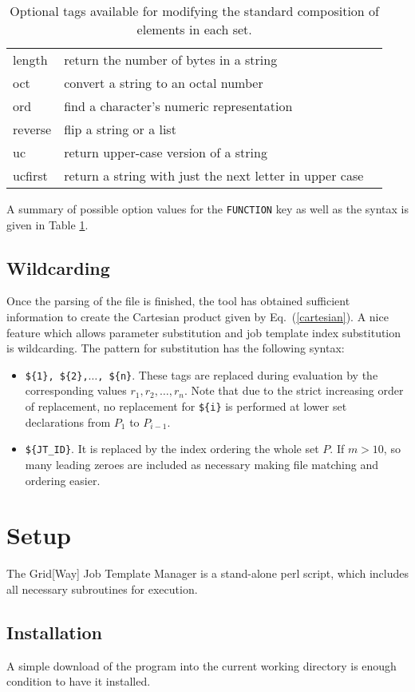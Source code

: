 \documentclass[12pt,a4paper]{article}
\newcommand{\eq}[1]{Eq.~(\ref{#1})}
\newcommand{\tab}[1]{Table \ref{#1}}
\begin{document}
\begin{table}[!ht]
{\begin{tabular}{lll}
 length&{\rm return the number of bytes in a string}\\
 oct&{\rm convert a string to an octal number}\\
 ord&{\rm find a character's numeric representation}\\
 reverse&{\rm flip a string or a list}\\
 uc&{\rm return upper-case version of a string}\\
 ucfirst&{\rm return a string with just the next letter in upper case}\\
\hline
\end{tabular}
}
\caption{Optional tags available for modifying the standard composition of elements in each set.}
\label{optionalsyntax}
\end{table}
A summary of possible option values for the {\tt FUNCTION} key as well as the syntax is given in \tab{optionalsyntax}.
\subsection{Wildcarding}
Once the parsing of the file is finished, the tool has obtained sufficient information to create the Cartesian product given by \eq{cartesian}. A nice feature which allows parameter substitution and job template index substitution is wildcarding. The pattern for substitution has the following syntax:
\begin{itemize}
\item {\tt \$\{1\}, \$\{2\},$\ldots$, \$\{n\}}. These tags are replaced during evaluation by the corresponding values $r_{1}, r_{2}, \ldots, r_{n}$. Note that due to the strict increasing order of replacement, no replacement for {\tt \$\{i\}} is performed at lower set declarations from $P_1$ to $P_{i-1}$.
\item {\tt \$\{JT\_ID\}}. It is replaced by the index ordering the whole set $P$. If $m>10$, so many leading zeroes are included as necessary making file matching and ordering easier.
\end{itemize}
\section{Setup}\label{setup}

The Grid[Way] Job Template Manager is a stand-alone perl script, which includes all necessary subroutines for execution.

\subsection{Installation}
A simple download of the program into the current working directory is enough condition to have it installed. 
\end{document}
